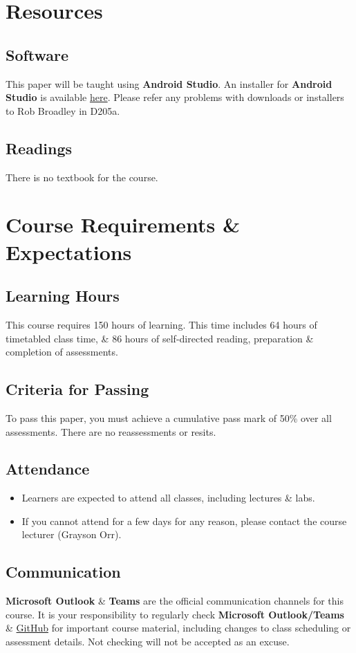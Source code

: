 \documentclass{article}
\begin{document}
\section*{Resources}

\subsection*{Software}
This paper will be taught using \textbf{Android Studio}. An installer for \textbf{Android Studio} is available \href{https://developer.android.com/studio}{here}. Please refer any problems with downloads or installers to Rob Broadley in D205a.

\subsection*{Readings}
There is no textbook for the course.

\section*{Course Requirements \& Expectations}

\subsection*{Learning Hours}
This course requires 150 hours of learning. This time includes 64 hours of timetabled class time, \& 86 hours of self-directed reading, preparation \& completion of assessments.

\subsection*{Criteria for Passing}
To pass this paper, you must achieve a cumulative pass mark of 50\% over all assessments. There are no reassessments or resits.

\subsection*{Attendance}
\begin{itemize}
	\item Learners are expected to attend all classes, including lectures \& labs.
	\item If you cannot attend for a few days for any reason, please contact the course lecturer (Grayson Orr).
\end{itemize}

\subsection*{Communication}
\textbf{Microsoft Outlook} \& \textbf{Teams} are the official communication channels for this course. It is your responsibility to regularly check \textbf{Microsoft Outlook/Teams }\& \href{https://github.com/otago-polytechnic-bit-courses/IN721-mobile-app-dev}{GitHub} for important course material, including changes to class scheduling or assessment details. Not checking will not be accepted as an excuse.
\end{document}
